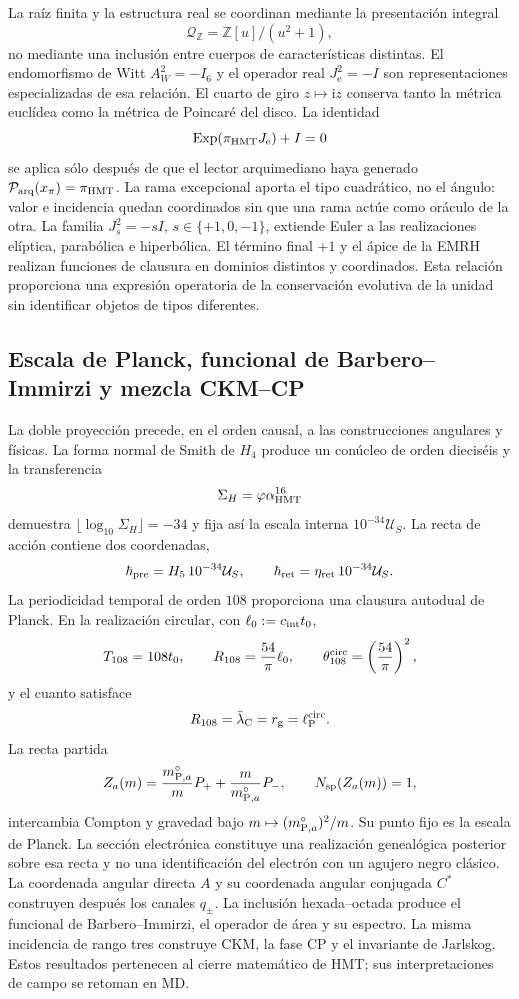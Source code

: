 La raíz finita y la estructura real se coordinan mediante la presentación
integral
\[
 \mathcal Q_{\mathbb Z}=\mathbb Z[u]/(u^2+1),
\]
no mediante una inclusión entre cuerpos de características distintas. El
endomorfismo de Witt \(A_W^2=-I_6\) y el operador real
\(J_{\mathrm e}^2=-I\) son representaciones especializadas de esa relación.
El cuarto de giro \(z\mapsto\mathrm iz\) conserva tanto la métrica euclídea
como la métrica de Poincaré del disco. La identidad
\[
 \operatorname{Exp}(\pi_{\rm HMT}J_{\mathrm e})+I=0
\]
se aplica sólo después de que el lector arquimediano haya generado
\(\mathcal P_{\rm arq}(x_\pi)=\pi_{\rm HMT}\). La rama excepcional aporta
el tipo cuadrático, no el ángulo: valor e incidencia quedan coordinados sin
que una rama actúe como oráculo de la otra.
La familia \(J_s^2=-sI\),
\(s\in\{+1,0,-1\}\), extiende Euler a las realizaciones elíptica,
parabólica e hiperbólica. El término final \(+1\) y el ápice de la EMRH
realizan funciones de clausura en dominios distintos y coordinados. Esta
relación proporciona una expresión operatoria de la conservación evolutiva de
la unidad sin identificar objetos de tipos diferentes.

\subsection*{Escala de Planck, funcional de Barbero--Immirzi y mezcla CKM--CP}

La doble proyección precede, en el orden causal, a las construcciones
angulares y físicas. La forma normal de Smith de \(H_4\) produce un conúcleo
de orden dieciséis y la transferencia
\[
 \Sigma_H=\varphi\alpha_{\rm HMT}^{16}
\]
demuestra
\(\lfloor\log_{10}\Sigma_H\rfloor=-34\) y fija así la escala interna
\(10^{-34}\mathcal U_S\). La recta de acción contiene dos
coordenadas,
\[
 \hbar_{\rm pre}=H_5\,10^{-34}\mathcal U_S,\qquad
 \hbar_{\rm ret}=\eta_{\rm ret}\,10^{-34}\mathcal U_S.
\]
La periodicidad temporal de orden \(108\) proporciona una clausura autodual
de Planck. En la realización circular, con
\(\ell_0:=c_{\rm int}t_0\),
\[
 T_{108}=108t_0,
 \qquad
 R_{108}=\frac{54}{\pi}\ell_0,
 \qquad
 \theta_{108}^{\rm circ}=\left(\frac{54}{\pi}\right)^2,
\]
y el cuanto satisface
\[
 R_{108}=\bar\lambda_{\rm C}=r_{\rm g}=\ell_{\rm P}^{\rm circ}.
\]
La recta partida
\[
 Z_a(m)=\frac{m_{{\rm P},a}^{\circ}}mP_+
       +\frac m{m_{{\rm P},a}^{\circ}}P_-,
 \qquad N_{\rm sp}(Z_a(m))=1,
\]
intercambia Compton y gravedad bajo
\(m\mapsto(m_{{\rm P},a}^{\circ})^2/m\). Su punto fijo es la escala de
Planck. La sección electrónica constituye una realización genealógica
posterior sobre esa recta y no una identificación del electrón con un agujero
negro clásico.
La coordenada angular directa \(A\) y su coordenada angular conjugada
\(C^*\) construyen después los canales
\(q_\pm\). La inclusión hexada--octada produce el funcional de
Barbero--Immirzi, el operador de área y su espectro. La misma incidencia de
rango tres construye CKM, la fase CP y el invariante de Jarlskog. Estos
resultados pertenecen al cierre matemático de HMT; sus interpretaciones de
campo se retoman en MD.

